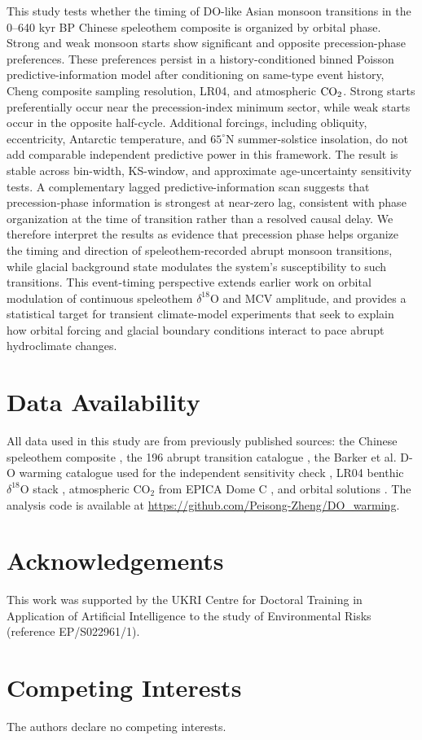 \documentclass[11pt]{article}
\begin{document}
This study tests whether the timing of DO-like Asian monsoon transitions in the 0--640 kyr BP Chinese speleothem composite is organized by orbital phase. Strong and weak monsoon starts show significant and opposite precession-phase preferences. These preferences persist in a history-conditioned binned Poisson predictive-information model after conditioning on same-type event history, Cheng composite sampling resolution, LR04, and atmospheric \(\ce{CO2}\). Strong starts preferentially occur near the precession-index minimum sector, while weak starts occur in the opposite half-cycle. Additional forcings, including obliquity, eccentricity, Antarctic temperature, and \(65^\circ\)N summer-solstice insolation, do not add comparable independent predictive power in this framework. The result is stable across bin-width, KS-window, and approximate age-uncertainty sensitivity tests. A complementary lagged predictive-information scan suggests that precession-phase information is strongest at near-zero lag, consistent with phase organization at the time of transition rather than a resolved causal delay. We therefore interpret the results as evidence that precession phase helps organize the timing and direction of speleothem-recorded abrupt monsoon transitions, while glacial background state modulates the system's susceptibility to such transitions. This event-timing perspective extends earlier work on orbital modulation of continuous speleothem \(\delta^{18}\mathrm{O}\) and MCV amplitude, and provides a statistical target for transient climate-model experiments that seek to explain how orbital forcing and glacial boundary conditions interact to pace abrupt hydroclimate changes.


\section*{Data Availability}

All data used in this study are from previously published sources: the Chinese speleothem composite \citep{cheng2016asian}, the 196 abrupt transition catalogue \citep{rousseau2023reliable}, the Barker et al. D-O warming catalogue used for the independent sensitivity check \citep{barker2011800}, LR04 benthic $\delta^{18}$O stack \citep{lisiecki2005pliocene}, atmospheric CO$_2$ from EPICA Dome C \citep{bereiter2015revision}, and orbital solutions \citep{laskar2004long}. The analysis code is available at \url{https://github.com/Peisong-Zheng/DO_warming}.

\section*{Acknowledgements}

This work was supported by the UKRI Centre for Doctoral Training in Application of Artificial Intelligence to the study of Environmental Risks (reference EP/S022961/1).

\section*{Competing Interests}

The authors declare no competing interests.



\end{document}
